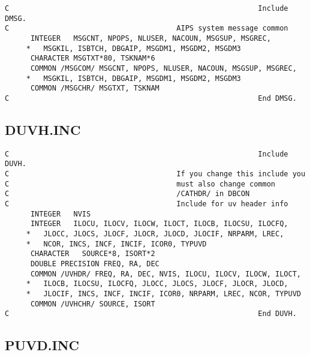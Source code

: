 \begin{verbatim}
C                                                          Include DMSG.
C                                       AIPS system message common
      INTEGER   MSGCNT, NPOPS, NLUSER, NACOUN, MSGSUP, MSGREC,
     *   MSGKIL, ISBTCH, DBGAIP, MSGDM1, MSGDM2, MSGDM3
      CHARACTER MSGTXT*80, TSKNAM*6
      COMMON /MSGCOM/ MSGCNT, NPOPS, NLUSER, NACOUN, MSGSUP, MSGREC,
     *   MSGKIL, ISBTCH, DBGAIP, MSGDM1, MSGDM2, MSGDM3
      COMMON /MSGCHR/ MSGTXT, TSKNAM
C                                                          End DMSG.

\end{verbatim}
\subsection{DUVH.INC}

\begin{verbatim}
C                                                          Include DUVH.
C                                       If you change this include you
C                                       must also change common
C                                       /CATHDR/ in DBCON
C                                       Include for uv header info
      INTEGER   NVIS
      INTEGER   ILOCU, ILOCV, ILOCW, ILOCT, ILOCB, ILOCSU, ILOCFQ,
     *   JLOCC, JLOCS, JLOCF, JLOCR, JLOCD, JLOCIF, NRPARM, LREC,
     *   NCOR, INCS, INCF, INCIF, ICOR0, TYPUVD
      CHARACTER   SOURCE*8, ISORT*2
      DOUBLE PRECISION FREQ, RA, DEC
      COMMON /UVHDR/ FREQ, RA, DEC, NVIS, ILOCU, ILOCV, ILOCW, ILOCT,
     *   ILOCB, ILOCSU, ILOCFQ, JLOCC, JLOCS, JLOCF, JLOCR, JLOCD,
     *   JLOCIF, INCS, INCF, INCIF, ICOR0, NRPARM, LREC, NCOR, TYPUVD
      COMMON /UVHCHR/ SOURCE, ISORT
C                                                          End DUVH.

\end{verbatim}
\subsection{PUVD.INC}

